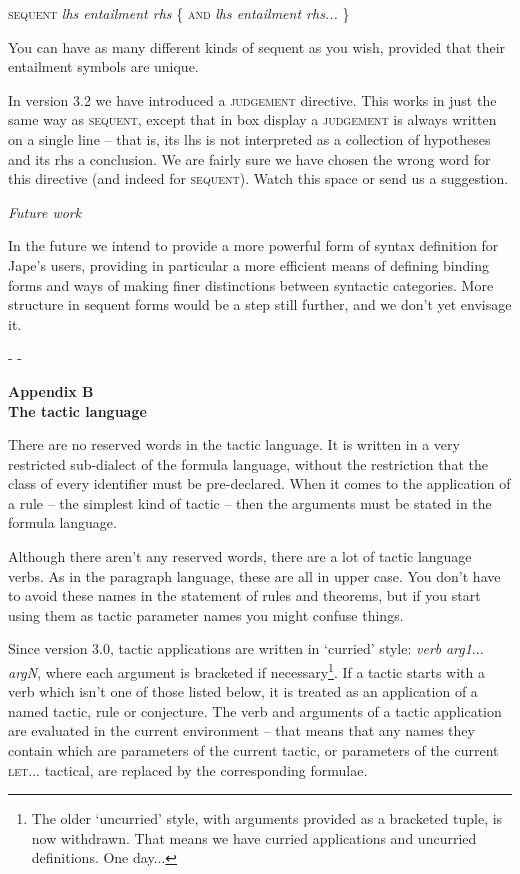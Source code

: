 \documentclass[11pt]{book}
\begin{document}
\textsc{sequent} \textit{lhs entailment rhs} \{ \textsc{and} \textit{lhs entailment rhs...} \}


You can have as many different kinds of sequent as you wish, provided that their entailment symbols are unique.


In version 3.2 we have introduced a \textsc{judgement} directive. This works in just the same way as \textsc{sequent}, except that in box display a \textsc{judgement} is always written on a single line -- that is, its lhs is not interpreted as a collection of hypotheses and its rhs a conclusion. We are fairly sure we have chosen the wrong word for this directive (and indeed for \textsc{sequent}). Watch this space or send us a suggestion.


\textit{Future work}


In the future we intend to provide a more powerful form of syntax definition for Jape's users, providing in particular a more efficient means of defining binding forms and ways of making finer distinctions between syntactic categories. More structure in sequent forms would be a step still further, and we don't yet envisage it.




\begin{center} -  -


\end{center} \textbf{{\huge Appendix B\\
The tactic language}}


There are no reserved words in the tactic language. It is written in a very restricted sub-dialect of the formula language, without the restriction that the class of every identifier must be pre-declared. When it comes to the application of a rule -- the simplest kind of tactic -- then the arguments must be stated in the formula language.


Although there aren't any reserved words, there are a lot of tactic language verbs. As in the paragraph language, these are all in upper case. You don't have to avoid these names in the statement of rules and theorems, but if you start using them as tactic parameter names you might confuse things.


Since version 3.0, tactic applications are written in `curried' style: \textit{verb} \textit{arg1}... \textit{argN}, where each argument is bracketed if necessary\footnote{The older `uncurried' style, with arguments provided as a bracketed tuple, is now withdrawn. That means we have curried applications and uncurried definitions. One day...}. If a tactic starts with a verb which isn't one of those listed below, it is treated as an application of a named tactic, rule or conjecture. The verb and arguments of a tactic application are evaluated in the current environment -- that means that any names they contain which are parameters of the current tactic, or parameters of the current \textsc{let...} tactical, are replaced by the corresponding formulae.
\end{document}
